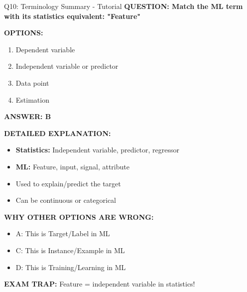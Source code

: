 \documentclass[8pt]{beamer}
\begin{document}
	\begin{frame}{Q10: Terminology Summary - Tutorial}
		\fontsize{6.5}{7.5}\selectfont
		\textbf{QUESTION: Match the ML term with its statistics equivalent: "Feature"}
		
		\vspace{0.1cm}
		\textbf{OPTIONS:}
		\begin{enumerate}
			\item Dependent variable
			\item Independent variable or predictor
			\item Data point
			\item Estimation
		\end{enumerate}
		
		\vspace{0.1cm}
		\textcolor{myblue}{\textbf{ANSWER: B}}
		
		\vspace{0.1cm}
		\textbf{DETAILED EXPLANATION:}
		\begin{itemize}
			\item \textbf{Statistics:} Independent variable, predictor, regressor
			\item \textbf{ML:} Feature, input, signal, attribute
			\item Used to explain/predict the target
			\item Can be continuous or categorical
		\end{itemize}
		
		\vspace{0.1cm}
		\textcolor{myred}{\textbf{WHY OTHER OPTIONS ARE WRONG:}}
		\begin{itemize}
			\item \textcolor{myred}{A:} This is Target/Label in ML
			\item \textcolor{myred}{C:} This is Instance/Example in ML
			\item \textcolor{myred}{D:} This is Training/Learning in ML
		\end{itemize}
		
		\textcolor{myred}{\textbf{EXAM TRAP:}} Feature = \textcolor{myblue}{independent variable} in statistics!
	\end{frame}
	
	
\end{document}

